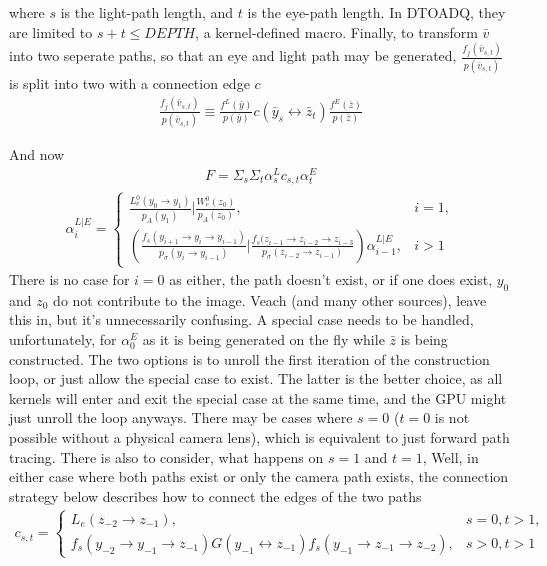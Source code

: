 \documentclass{article}
\begin{document}
    where $s$ is the light-path length, and $t$ is the eye-path length. In
    DTOADQ, they are limited to $s+t \leq DEPTH$, a kernel-defined macro. Finally, to transform
    $\bar{v}$ into two seperate paths, so that an eye and light path may be generated, $\frac{f_j(\bar{v}_{s,
        t})}{p(\bar{v}_{s, t})}$ is split into two with a connection edge $c$
  \begin{align}
    \frac{f_j(\bar{v}_{s, t})}{p(\bar{v}_{s, t})} \equiv
    \frac{f^L(\bar{y})}{p(\bar{y})} c(\bar{y}_s \leftrightarrow \bar{z}_t)
    \frac{f^E(\bar{z})}{p(\bar{z})}  
  \end{align}

    And now
  \begin{align}
    F = \Sigma_s\Sigma_t \alpha^L_s c_{s, t} \alpha^E_t
  \end{align}
  \begin{align}
    \alpha^{L|E}_i =
    \begin{cases}
      \frac{L_e^0(y_0 \rightarrow y_1)}{p_A(y_1)} | \frac{W^0_e(z_0)}{p_A(z_0)},
      &i = 1,\\
      (\frac{f_s(y_{i+1} \rightarrow y_i \rightarrow y_{i-1})}{p_{\sigma}(y_i
      \rightarrow y_{i-1})} | \frac{f_s(z_{i-1} \rightarrow z_{i-2} \rightarrow
      z_{i-3}}{p_\sigma(z_{i-2} \rightarrow z_{i-1})}) \alpha^{L|E}_{i-1},
      &i > 1
    \end{cases}
  \end{align}
    There is no case for $i = 0$ as either, the path doesn't exist, or if one
    does exist, $y_0$ and $z_0$ do not contribute to the image. Veach (and many other
    sources), leave this in, but it's unnecessarily confusing. A special case
    needs to be handled, unfortunately, for $\alpha^E_0$ as it is being
    generated on the fly while $\bar{z}$ is being constructed. The two options
    is to unroll the first iteration of the construction loop, or just allow the
    special case to exist. The latter is the better choice, as all kernels will
    enter and exit the special case at the same time, and the GPU might just
    unroll the loop anyways.
    There may be cases where $s = 0$ ($t = 0$ is not possible without a
    physical camera lens), which is equivalent to just forward path tracing.
    There is also to consider, what happens on $s = 1$ and $t = 1$, %
    Well, in either case where both paths exist or only the camera path exists,
    the connection strategy below describes how to connect the edges of the two
    paths
  \begin{align}
    c_{s, t} =
    \begin{cases}
      L_e(z_{-2} \rightarrow z_{-1}), &s = 0, t > 1,\\
      f_s(y_{-2} \rightarrow y_{-1} \rightarrow z_{-1}) G(y_{-1} \leftrightarrow
      z_{-1}) f_s(y_{-1} \rightarrow z_{-1} \rightarrow z_{-2}), &s > 0, t > 1
    \end{cases}
  \end{align}
\end{document}
